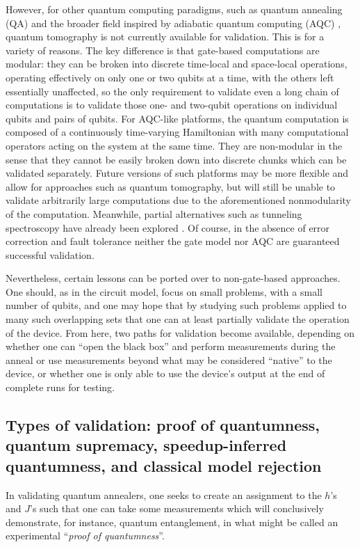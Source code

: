However, for other quantum computing paradigms, such as quantum annealing (QA) \cite{kadowaki_quantum_1998,RevModPhys.80.1061} and the broader field inspired by adiabatic quantum computing (AQC) \cite{farhi2001quantum,2002quant.ph.11152K,Kaminsky:2004fk,Albash-Lidar:RMP}, quantum tomography is not currently available for validation. This is for a variety of reasons. The key difference is that gate-based computations are modular: they can be broken into discrete time-local and space-local operations, operating effectively on only one or two qubits at a time, with the others left essentially unaffected, so the only requirement to validate even a long chain of computations is to validate those one- and two-qubit operations on individual qubits and pairs of qubits. For AQC-like platforms, the quantum computation is composed of a continuously time-varying Hamiltonian with many computational operators acting on the system at the same time. They are non-modular in the sense that they cannot be easily broken down into discrete chunks which can be validated separately. Future versions of such platforms may be more flexible and allow for approaches such as quantum tomography, but will still be unable to validate arbitrarily large computations due to the aforementioned nonmodularity of the computation. Meanwhile, partial alternatives such as tunneling spectroscopy have already been explored \cite{Berkley:2013bf}. Of course, in the absence of error correction and fault tolerance neither the gate model nor AQC are guaranteed successful validation.

Nevertheless, certain lessons can be ported over to non-gate-based approaches. One should, as in the circuit model, focus on small problems, with a small number of qubits, and one may hope that by studying such problems applied to many such overlapping sets that one can at least partially validate the operation of the device. From here, two paths for validation become available, depending on whether one can ``open the black box'' and perform measurements during the anneal or use measurements beyond what may be considered ``native'' to the device, or whether one is only able to use the device's output at the end of complete runs for testing.

\subsection{Types of validation: proof of quantumness, quantum supremacy, speedup-inferred quantumness, and classical model rejection}
In validating quantum annealers, one seeks to create an assignment to the $h$'s and $J$'s such that one can take some measurements which will conclusively demonstrate, for instance, quantum entanglement, in what might be called an experimental ``\emph{proof of quantumness}''.


